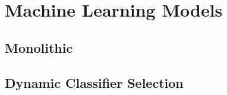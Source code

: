 \chapter{Machine Learning Models}

\section{Monolithic}
    
    
    
    
    
    

\section{Dynamic Classifier Selection}
    
    
    
    
    
    